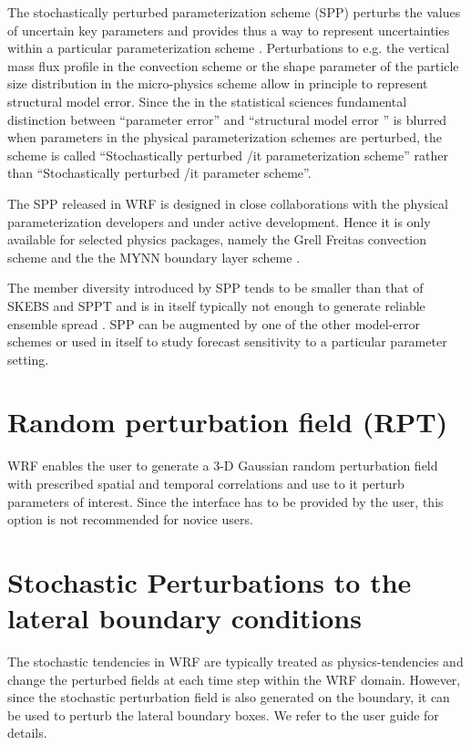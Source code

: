 The stochastically perturbed parameterization scheme (SPP)
perturbs the values of uncertain key parameters and provides 
thus a way to represent uncertainties within a particular parameterization scheme
\citep{Bo08,Ha11a}.
Perturbations to e.g. the vertical mass flux profile 
in the convection scheme or the shape parameter of the particle size distribution in the
micro-physics scheme allow in principle to represent structural model error.
Since the in the statistical sciences fundamental distinction between ``parameter error'' and 
``structural model error '' is blurred when parameters in the physical parameterization schemes 
are perturbed, the scheme is called ``Stochastically perturbed {/it parameterization} scheme''
rather than ``Stochastically perturbed {/it parameter} scheme''. 

The SPP released in WRF is designed in close collaborations with the physical
parameterization developers and under active development. Hence it is only
available for selected physics packages, namely the Grell Freitas convection
scheme and the the MYNN boundary layer scheme \citep{jankov2017performance}.

The member diversity introduced by SPP tends to be smaller than that of SKEBS and SPPT 
and is in itself typically not enough to generate reliable ensemble spread 
\citep{Be15}.
SPP can be augmented by one of the other model-error schemes or used in itself to study 
forecast sensitivity to a particular parameter setting.

\section {Random perturbation field (RPT)}
WRF enables the user to generate a 3-D Gaussian random perturbation field
with prescribed spatial and temporal correlations and use to it perturb
parameters of interest.  Since the interface has to be provided by the
user, this option is not recommended for novice users.

\section {Stochastic Perturbations to the lateral boundary conditions}
The stochastic tendencies in WRF are typically treated as physics-tendencies and change the 
perturbed fields at each time step within the WRF domain. However, since the stochastic
perturbation field is also generated on the boundary, it can be used to perturb the lateral boundary 
boxes. We refer to the user guide for details.

